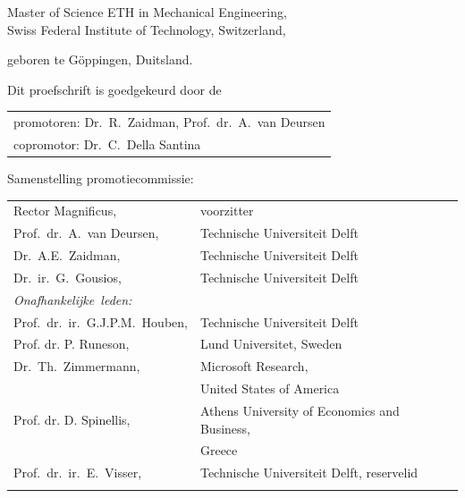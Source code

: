 \begin{titlepage}
\begin{center}
\bigskip
\bigskip

Master of Science ETH in Mechanical Engineering, \\
Swiss Federal Institute of Technology, Switzerland,

geboren te Göppingen, Duitsland.

\vspace*{2\bigskipamount}

\end{center}

\clearpage
\thispagestyle{empty}

\noindent Dit proefschrift is goedgekeurd door de

\medskip\noindent
\begin{tabular}{l}
    promotoren: Dr.\ R.\ Zaidman, Prof.\ dr.\ A.\ van Deursen \\
    copromotor: Dr.\ C.\ Della Santina
\end{tabular}

\bigskip
\noindent Samenstelling promotiecommissie:

\medskip\noindent
\begin{tabular}{p{4.5cm}l}
    Rector Magnificus, & voorzitter \\
    Prof.\ dr.\ A.\ van Deursen, & Technische Universiteit Delft \\
    Dr.\ A.E.\ Zaidman, & Technische Universiteit Delft \\
    Dr.\ ir.\ G.\ Gousios, & Technische Universiteit Delft \\

    \medskip
    \mbox{\emph{Onafhankelijke leden:}} & \\
    Prof.\ dr.\ ir.\ G.J.P.M.\ Houben, & Technische Universiteit Delft \\
    Prof. dr. P. Runeson, & Lund Universitet, Sweden \\
    Dr.\ Th.\ Zimmermann, & Microsoft Research, \\ &United States of America \\
    Prof. dr. D. Spinellis, & Athens University of Economics and Business, \\&
    Greece \\
    
    Prof.\ dr.\ ir.\ E.\ Visser, & Technische Universiteit Delft, reservelid \\ \\


\end{tabular}
\end{titlepage}
